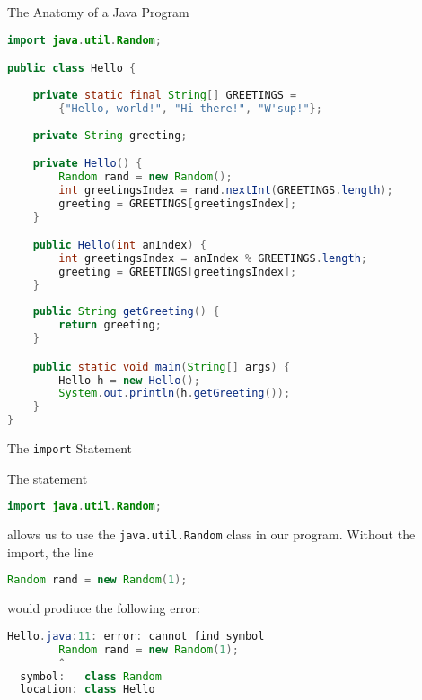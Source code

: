 \documentclass{beamer}
\author[Chris Simpkins] 
{Christopher Simpkins \\\texttt{chris.simpkins@gatech.edu}}
\institute[Georgia Tech] %
\date[CS 1331]{}
\title[\course] %
{\lesson}
\subtitle{}
\begin{document}
\begin{frame}
  \titlepage
\end{frame}


\begin{frame}[fragile]{The Anatomy of a Java Program}


\vspace{-.1in}
\begin{lstlisting}[language=Java,textsize=8pt]
import java.util.Random;

public class Hello {
    
    private static final String[] GREETINGS =
        {"Hello, world!", "Hi there!", "W'sup!"};
    
    private String greeting;

    private Hello() {
        Random rand = new Random();
        int greetingsIndex = rand.nextInt(GREETINGS.length);
        greeting = GREETINGS[greetingsIndex];
    }

    public Hello(int anIndex) {
        int greetingsIndex = anIndex % GREETINGS.length;
        greeting = GREETINGS[greetingsIndex];
    }
    
    public String getGreeting() {
        return greeting;
    }

    public static void main(String[] args) {
        Hello h = new Hello();
        System.out.println(h.getGreeting());
    }
}
\end{lstlisting}

\end{frame}

\begin{frame}[fragile]{The {\tt import} Statement}


The statement
\begin{lstlisting}[language=Java]
import java.util.Random;
\end{lstlisting}
allows us to use the {\tt java.util.Random} class in our program.  Without the import, the line
\begin{lstlisting}[language=Java]
  Random rand = new Random(1);
\end{lstlisting}
would prodiuce the following error:
\begin{lstlisting}[language=Java]
Hello.java:11: error: cannot find symbol
        Random rand = new Random(1);
        ^
  symbol:   class Random
  location: class Hello
\end{lstlisting}

\end{frame}
\end{document}
